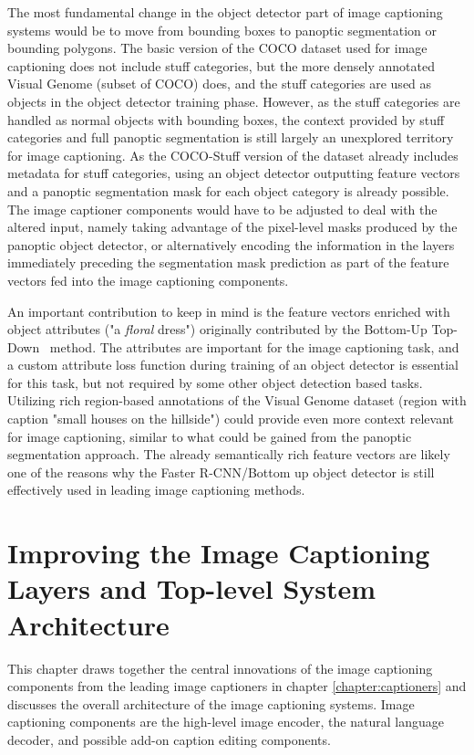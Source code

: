 \documentclass[english,twoside,openright]{HYgraduMLDS}
\begin{document}
The most fundamental change in the object detector part of image captioning systems would be to move from bounding boxes to panoptic segmentation or bounding polygons. The basic version of the COCO dataset used for image captioning does not include stuff categories, but the more densely annotated Visual Genome (subset of COCO) does, and the stuff categories are used as objects in the object detector training phase. However, as the stuff categories are handled as normal objects with bounding boxes, the context provided by stuff categories and full panoptic segmentation is still largely an unexplored territory for image captioning. As the COCO-Stuff version of the dataset already includes metadata for stuff categories, using an object detector outputting feature vectors and a panoptic segmentation mask for each object category is already possible. The image captioner components would have to be adjusted to deal with the altered input, namely taking advantage of the pixel-level masks produced by the panoptic object detector, or alternatively encoding the information in the layers immediately preceding the segmentation mask prediction as part of the feature vectors fed into the image captioning components. 

An important contribution to keep in mind is the feature vectors enriched with object attributes ("a \textit{floral} dress") originally contributed by the Bottom-Up Top-Down~\cite{BottomUp} method. The attributes are important for the image captioning task, and a custom attribute loss function during training of an object detector is essential for this task, but not required by some other object detection based tasks. Utilizing rich region-based annotations of the Visual Genome dataset (region with caption "small houses on the hillside") could provide even more context relevant for image captioning, similar to what could be gained from the panoptic segmentation approach. The already semantically rich feature vectors are likely one of the reasons why the Faster R-CNN/Bottom up object detector is still effectively used in leading image captioning methods. \\

\chapter{Improving the Image Captioning Layers and Top-level System Architecture}
\label{chapter:improving_system}
This chapter draws together the central innovations of the image captioning components from the leading image captioners in chapter \ref{chapter:captioners} and discusses the overall architecture of the image captioning systems. Image captioning components are the high-level image encoder, the natural language decoder, and possible add-on caption editing components. 
\end{document}
